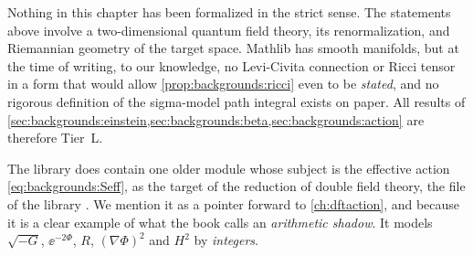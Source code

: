 Nothing in this chapter has been formalized in the strict sense. The statements above
involve a two-dimensional quantum field theory, its renormalization, and Riemannian geometry
of the target space. Mathlib has smooth manifolds, but at the time of writing, to our
knowledge, no Levi-Civita connection or Ricci tensor in a form that would allow
\cref{prop:backgrounds:ricci} even to be \emph{stated}, and no rigorous definition of the
sigma-model path integral exists on paper. All results of
\cref{sec:backgrounds:einstein,sec:backgrounds:beta,sec:backgrounds:action} are therefore
Tier~L.

The library does contain one older module whose subject is the effective action
\eqref{eq:backgrounds:Seff}, as the target of the reduction of double field theory, the file
 of the library . We mention it as a
pointer forward to
\cref{ch:dftaction}, and because it is a clear example of what the book calls an
\emph{arithmetic shadow}. It models $\sqrt{-G}$, $\ee^{-2\Phi}$, $R$, $(\nabla\Phi)^2$ and
$H^2$ by \emph{integers}.

